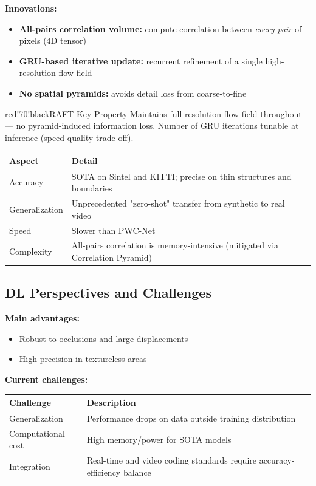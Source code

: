 \textbf{Innovations:}

\begin{itemize}
\item \textbf{All-pairs correlation volume:} compute correlation between \textit{every pair} of pixels (4D tensor)
\item \textbf{GRU-based iterative update:} recurrent refinement of a single high-resolution flow field
\item \textbf{No spatial pyramids:} avoids detail loss from coarse-to-fine
\end{itemize}

\begin{calloutbox}{red!70!black}{RAFT Key Property}
Maintains full-resolution flow field throughout — no pyramid-induced information loss. Number of GRU iterations tunable at inference (speed-quality trade-off).
\end{calloutbox}

\begin{center}
\begin{tabular}{|l|l|}
\hline
\textbf{Aspect} & \textbf{Detail} \\ \hline
Accuracy & SOTA on Sintel and KITTI; precise on thin structures and boundaries \\ \hline
Generalization & Unprecedented "zero-shot" transfer from synthetic to real video \\ \hline
Speed & Slower than PWC-Net \\ \hline
Complexity & All-pairs correlation is memory-intensive (mitigated via Correlation Pyramid) \\ \hline
\end{tabular}
\end{center}

\subsection{DL Perspectives and Challenges}

\textbf{Main advantages:}
\begin{itemize}
\item Robust to occlusions and large displacements
\item High precision in textureless areas
\end{itemize}

\textbf{Current challenges:}

\begin{center}
\begin{tabular}{|l|l|}
\hline
\textbf{Challenge} & \textbf{Description} \\ \hline
Generalization & Performance drops on data outside training distribution \\ \hline
Computational cost & High memory/power for SOTA models \\ \hline
Integration & Real-time and video coding standards require accuracy-efficiency balance \\ \hline
\end{tabular}
\end{center}

